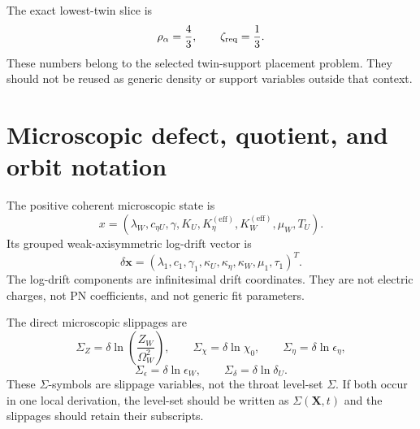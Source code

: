 The exact lowest-twin slice is
\begin{equation}
  \rho_\alpha=\frac43,
  \qquad
  \zeta_{\rm req}=\frac13.
\end{equation}
These numbers belong to the selected twin-support placement problem.  They should not be reused as generic density or support variables outside that context.

\section{Microscopic defect, quotient, and orbit notation}
\label{sec:quotient-orbit-notation}

The positive coherent microscopic state is
\begin{equation}
  x=(\lambda_W,c_{\eta U},\gamma,K_U,K_\eta^{(\mathrm{eff})},K_W^{(\mathrm{eff})},\mu_W,T_U).
\end{equation}
Its grouped weak-axisymmetric log-drift vector is
\begin{equation}
  \delta\mathbf x
  =
  (\lambda_1,c_1,\gamma_1,\kappa_U,\kappa_\eta,\kappa_W,\mu_1,\tau_1)^T.
\end{equation}
The log-drift components are infinitesimal drift coordinates.  They are not electric charges, not PN coefficients, and not generic fit parameters.

The direct microscopic slippages are
\begin{equation}
  \Sigma_Z=\delta\ln\!\left(\frac{Z_W}{\Omega_W^2}\right),
  \qquad
  \Sigma_\chi=\delta\ln\chi_0,
  \qquad
  \Sigma_\eta=\delta\ln\epsilon_\eta,
\end{equation}
\begin{equation}
  \Sigma_\epsilon=\delta\ln\epsilon_W,
  \qquad
  \Sigma_\delta=\delta\ln\delta_U.
\end{equation}
These \(\Sigma\)-symbols are slippage variables, not the throat level-set \(\Sigma\).  If both occur in one local derivation, the level-set should be written as \(\Sigma(\mathbf X,t)\) and the slippages should retain their subscripts.

